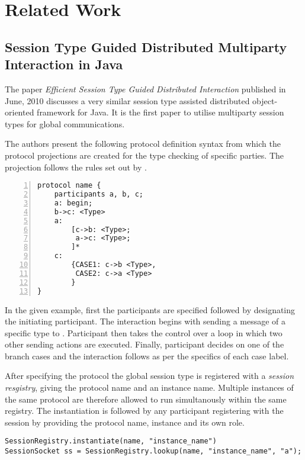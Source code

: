 \cleardoublepage
\chapter{Related Work}
\label{ch:related}

	
\section{Session Type Guided Distributed Multiparty Interaction in Java}
\label{sec:mpstjava}

The paper \textit{Efficient Session Type Guided Distributed Interaction} \cite{sess_type_guided_distr_interact} published in June, 2010 discusses a very similar session type assisted distributed object-oriented framework for Java. It is the first paper to utilise multiparty session types for global communications.

The authors present the following protocol definition syntax from which the protocol projections are created for the type checking of specific parties. The projection follows the rules set out by \cite{multiparty_sess_types}.

\begin{lstlisting}[basicstyle=\LISTINGSTYLE, numbers=left]
protocol name {
	participants a, b, c;
	a: begin;
	b->c: <Type>
	a:
		[c->b: <Type>;
		 a->c: <Type>;
		]*
	c: 
		{CASE1: c->b <Type>,
		 CASE2: c->a <Type>
		} 
} 
\end{lstlisting}

In the given example, first the participants are specified followed by designating the initiating participant. The interaction begins with  sending a message of a specific type to . Participant  then takes the control over a loop in which two other sending actions are executed. Finally, participant  decides on one of the branch cases and the interaction follows as per the specifics of each case label.  

After specifying the protocol the global session type is registered with a \textit{session resgistry}, giving the protocol name and an instance name. Multiple instances of the same protocol are therefore allowed to run simultanously within the same registry. The instantiation is followed by any participant registering with the session by providing the protocol name, instance and its own role.

\begin{lstlisting}[basicstyle=\LISTINGSTYLE]
SessionRegistry.instantiate(name, "instance_name")
SessionSocket ss = SessionRegistry.lookup(name, "instance_name", "a");
\end{lstlisting}

